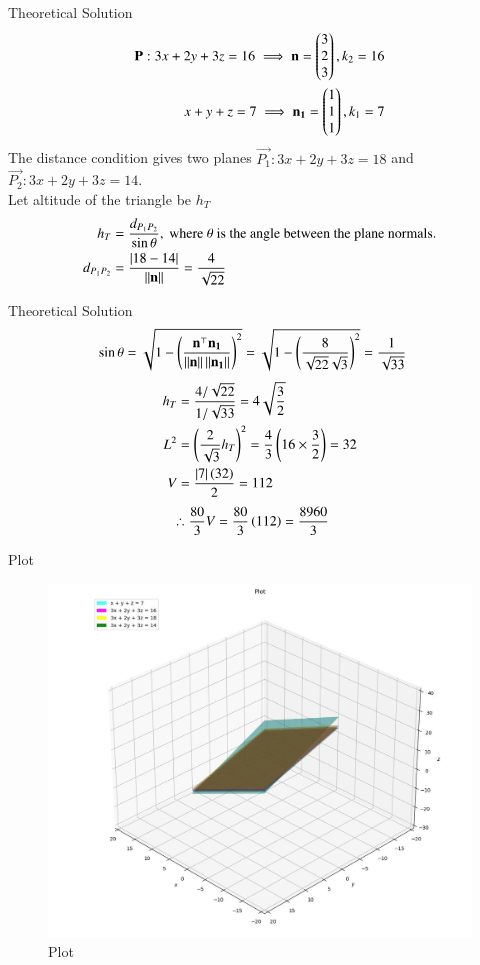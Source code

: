 \documentclass{beamer}
\begin{document}
\begin{frame}{Theoretical Solution}
\begin{align}
    \mathbf{P}: 3x+2y+3z=16 \implies \mathbf{n} = \begin{pmatrix}3 \\ 2 \\ 3\end{pmatrix}, k_2=16 \\
    x+y+z=7 \implies \mathbf{n_1} = \begin{pmatrix}1 \\ 1 \\ 1\end{pmatrix}, k_1=7 \\
\end{align}
The distance condition gives two planes $\vec{P_1}: 3x+2y+3z=18$ and $\vec{P_2}: 3x+2y+3z=14$. \\
Let altitude of the triangle be $h_T$
\begin{align}
    h_T &= \frac{d_{P_1P_2}}{\sin\theta},\text{ where }\theta\text{ is the angle between the plane normals.} \\
    d_{P_1P_2} &= \frac{\left\vert18-14\right\vert}{\left\lVert\mathbf{n}\right\rVert} = \frac{4}{\sqrt{22}} \\
\end{align}
\end{frame}

\begin{frame}{Theoretical Solution}
\begin{align}
    \sin\theta &= \sqrt{1 - \left(\frac{\mathbf{n}^\top\mathbf{n_1}}{\left\lVert\mathbf{n}\right\rVert\left\lVert\mathbf{n_1}\right\rVert}\right)^2} = \sqrt{1 - \left(\frac{8}{\sqrt{22}\sqrt{3}}\right)^2} = \frac{1}{\sqrt{33}}
\end{align}
\begin{align}
    h_T &= \frac{4/\sqrt{22}}{1/\sqrt{33}} = 4\sqrt{\frac{3}{2}} \\
    L^2 &= \left(\frac{2}{\sqrt{3}}h_T\right)^2 = \frac{4}{3}\left(16 \times \frac{3}{2}\right) = 32 \\
    V &= \frac{\left\vert7\right\vert\left(32\right)}{2} = 112
\end{align}
\begin{align}
    \therefore \frac{80}{3}V &= \frac{80}{3}\left(112\right) = \frac{8960}{3}
\end{align}
\end{frame}

\begin{frame}{Plot}
\begin{figure}
	\centering
	\includegraphics[width=0.5\columnwidth]{../figs/plot_p.jpg}
	\caption{Plot}
	\label{fig:fig}
\end{figure}
\end{frame}
\end{document}
